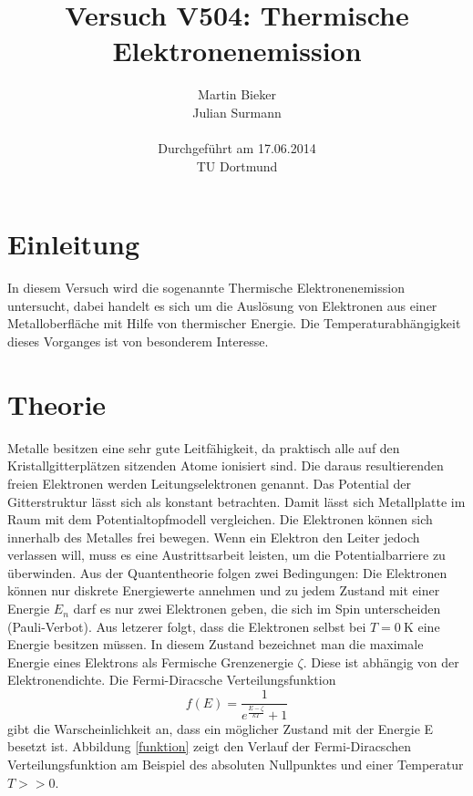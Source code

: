 \documentclass[11pt,ngerman,a4paper]{article}
\title{\textbf{Versuch V504: Thermische Elektronenemission}}
\author{Martin Bieker\\
Julian Surmann\\
\\
Durchgef\"{u}hrt am 17.06.2014\\
TU Dortmund}
\date{}
\begin{document}
\renewcommand\tablename{Tabelle}
\renewcommand\figurename{Abbildung}
\maketitle
\thispagestyle{empty}
\newpage
\clearpage
\setcounter{page}{1}


\section{Einleitung}
In diesem Versuch wird die sogenannte Thermische Elektronenemission untersucht, dabei handelt es sich um die Auslösung von Elektronen aus einer Metalloberfläche mit Hilfe von thermischer Energie. Die Temperaturabhängigkeit dieses Vorganges ist von besonderem Interesse.
\section{Theorie}
Metalle besitzen eine sehr gute Leitfähigkeit, da praktisch alle auf den Kristallgitterplätzen sitzenden Atome ionisiert sind. Die daraus resultierenden freien Elektronen werden Leitungselektronen genannt. Das Potential der Gitterstruktur lässt sich als konstant betrachten. Damit lässt sich Metallplatte im Raum mit dem Potentialtopfmodell vergleichen. Die Elektronen können sich innerhalb des Metalles frei bewegen. Wenn ein Elektron den Leiter jedoch verlassen will, muss es eine Austrittsarbeit leisten, um die Potentialbarriere zu überwinden. Aus der Quantentheorie folgen zwei Bedingungen: Die Elektronen können nur diskrete Energiewerte annehmen und zu jedem Zustand mit einer Energie $E_n$ darf es nur zwei Elektronen geben, die sich im Spin unterscheiden (Pauli-Verbot). Aus letzerer folgt, dass die Elektronen selbst bei $T = \SI{0}{\kelvin}$ eine Energie besitzen müssen. In diesem Zustand bezeichnet man die maximale Energie eines Elektrons als Fermische Grenzenergie $\zeta$. Diese ist abhängig von der Elektronendichte. Die Fermi-Diracsche Verteilungsfunktion
\begin{equation}
f(E) = \frac{1}{e^{\frac{E-\zeta}{k T}}+1}
\end{equation}
gibt die Warscheinlichkeit an, dass ein möglicher Zustand mit der Energie E besetzt ist.
Abbildung \ref{funktion} zeigt den Verlauf der Fermi-Diracschen Verteilungsfunktion am Beispiel des absoluten Nullpunktes und einer Temperatur $T >> 0$.
\end{document}
